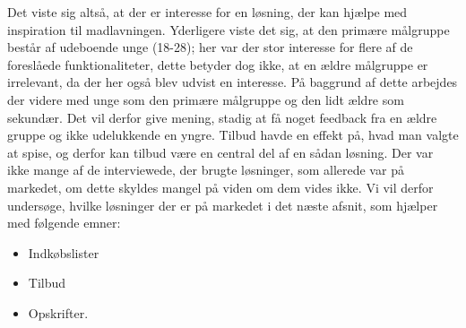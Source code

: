 Det viste sig altså, at der er interesse for en løsning, der kan hjælpe med inspiration til madlavningen. 
Yderligere viste det sig, at den primære målgruppe består af udeboende unge (18-28); her var der stor interesse for flere af de foreslåede funktionaliteter, dette betyder dog ikke, at en ældre målgruppe er irrelevant, da der her også blev udvist en interesse.
På baggrund af dette arbejdes der videre med unge som den primære målgruppe og den lidt ældre som sekundær.
Det vil derfor give mening, stadig at få noget feedback fra en ældre gruppe og ikke udelukkende en yngre.
Tilbud havde en effekt på, hvad man valgte at spise, og derfor kan tilbud være en central del af en sådan løsning.
Der var ikke mange af de interviewede, der brugte løsninger, som allerede var på markedet, om dette skyldes mangel på viden om dem vides ikke.
Vi vil derfor undersøge, hvilke løsninger der er på markedet i det næste afsnit, som hjælper med følgende emner:

\begin{itemize}[nolistsep,noitemsep]
	\item Indkøbslister
	\item Tilbud
	\item Opskrifter.
\end{itemize}
